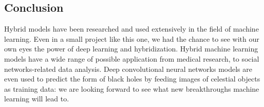 \documentclass[10pt,a4paper]{article}
\begin{document}
	\subsection{Conclusion}
	Hybrid models have been researched and used extensively in the field of machine learning. Even in a small project like this one, we had the chance to see with our own eyes the power of deep learning and hybridization. Hybrid machine learning models have a wide range of possible application from medical research, to social networks-related data analysis. Deep convolutional neural networks models are even used to predict the form of black holes by feeding images of celestial objects as training data\cite{DBLP:journals/corr/GeorgeH17}: we are looking forward to see what new breakthroughs machine learning will lead to.
	\newpage
	
	
\end{document}
